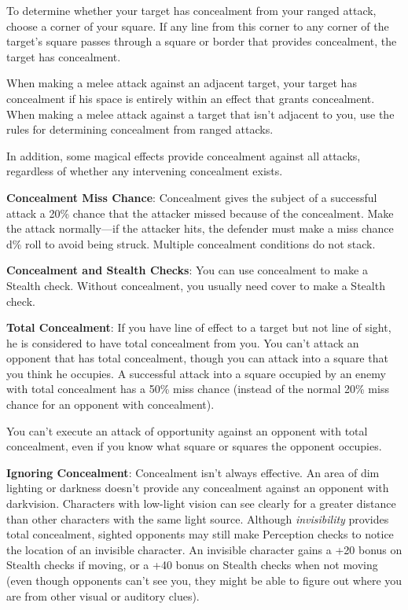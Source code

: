				
To determine whether your target has concealment from your ranged attack, choose a corner of your square. If any line from this corner to any corner of the target's square passes through a square or border that provides concealment, the target has concealment.
				
When making a melee attack against an adjacent target, your target has concealment if his space is entirely within an effect that grants concealment. When making a melee attack against a target that isn't adjacent to you, use the rules for determining concealment from ranged attacks.
				
In addition, some magical effects provide concealment against all attacks, regardless of whether any intervening concealment exists.
				
\textbf{Concealment Miss Chance}: Concealment gives the subject of a successful attack a 20\% chance that the attacker missed because of the concealment. Make the attack normally---if the attacker hits, the defender must make a miss chance d\% roll to avoid being struck. Multiple concealment conditions do not stack.
				
\textbf{Concealment and Stealth Checks}: You can use concealment to make a Stealth check. Without concealment, you usually need cover to make a Stealth check.
				
\textbf{Total Concealment}: If you have line of effect to a target but not line of sight, he is considered to have total concealment from you. You can't attack an opponent that has total concealment, though you can attack into a square that you think he occupies. A successful attack into a square occupied by an enemy with total concealment has a 50\% miss chance (instead of the normal 20\% miss chance for an opponent with concealment).
				
You can't execute an attack of opportunity against an opponent with total concealment, even if you know what square or squares the opponent occupies.
				
\textbf{Ignoring Concealment}: Concealment isn't always effective. An area of dim lighting or darkness doesn't provide any concealment against an opponent with darkvision. Characters with low-light vision can see clearly for a greater distance than other characters with the same light source. Although \textit{invisibility} provides total concealment, sighted opponents may still make Perception checks to notice the location of an invisible character. An invisible character gains a +20 bonus on Stealth checks if moving, or a +40 bonus on Stealth checks when not moving (even though opponents can't see you, they might be able to figure out where you are from other visual or auditory clues).
				
